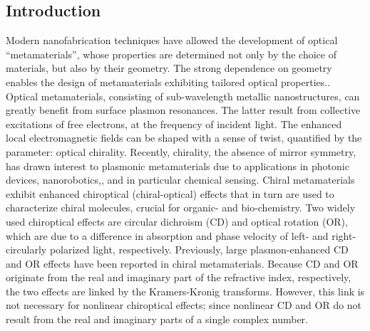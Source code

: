 \subsection{Introduction}\label{sec:results:OAinPlanarNanohelices:introduction}
Modern nanofabrication techniques have allowed the development of optical “metamaterials”, whose properties are determined not only by the choice of materials, but also by their geometry. The strong dependence on geometry enables the design of metamaterials exhibiting tailored optical properties.\cite{Pendry2004a, Alu2007, Kauranen2012, Meinzer2014, Moitra2015, Cong2015, Prudencio2016}. 
Optical metamaterials, consisting of sub-wavelength metallic nanostructures, can greatly benefit from surface plasmon resonances. The latter result from collective excitations of free electrons, at the frequency of incident light. The enhanced local electromagnetic fields can be shaped with a sense of twist, quantified by the parameter: optical chirality.\cite{Tang2010, Schaferling2012}
Recently, chirality, the absence of mirror symmetry, has drawn interest to plasmonic metamaterials due to applications in photonic devices,\cite{Rizza2015, Esposito2016, Hou2016} nanorobotics,\cite{Urban2015, Schamel2013a}, and in particular chemical sensing.
Chiral metamaterials exhibit enhanced chiroptical (chiral-optical) effects\cite{Schaferling2014, Karimullah2015, Canaguier-Durand2014} that in turn are used to characterize chiral molecules, crucial for organic- and bio-chemistry.\cite{Zhao2017, Hendry2010, Tullius2015}
Two widely used chiroptical effects are circular dichroism (CD) and optical rotation (OR), which are due to a difference in absorption and phase velocity of left- and right- circularly polarized light, respectively. Previously, large plasmon-enhanced CD and OR effects have been reported in chiral metamaterials.\cite{Papakostas2003, Kuwata-Gonokami2005a, Decker2007, Plum2007, Gansel2011}
Because CD and OR originate from the real and imaginary part of the refractive index, respectively, the two effects are linked by the Kramers-Kronig transforms.\cite{Barron2004, Parson2007, Govorov2011}
However, this link is not necessary for nonlinear chiroptical effects; since nonlinear CD and OR do not result from the real and imaginary parts of a single complex number. 

